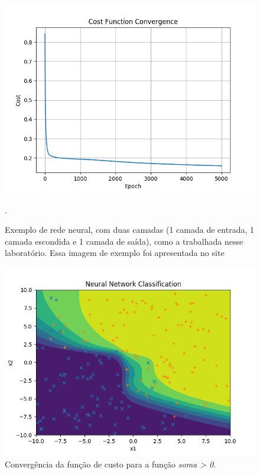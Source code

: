 \documentclass[conference]{IEEEtran}
\begin{document}
\begin{figure}[htbp]
\centering
\centerline{\includegraphics[scale=0.5]{imagens/sum_gt_zero/lambda_zero/convergence_sgz.png}}
\caption{Exemplo de rede neural, com duas camadas (1 camada de entrada, 1 camada escondida e 1 camada de saída), como a trabalhada nesse laboratório. Essa imagem de exemplo foi apresentada no site \cite{neural-net-np}}.
\label{sum_gt_zero/lambda_zero/convergence_sgz}
\end{figure}

\begin{figure}[htbp]
\centering
\centerline{\includegraphics[scale=0.5]{imagens/sum_gt_zero/lambda_zero/nn_classification_sgz.png}}
\caption{Convergência da função de custo para a função \textit{soma > 0}.}
\label{sum_gt_zero/lambda_zero/nn_classification_sgz}
\end{figure}
\end{document}
